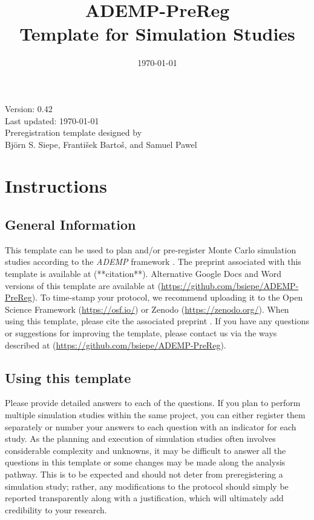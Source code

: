 \documentclass[12pt]{article}
\title{ADEMP-PreReg \\ Template for Simulation Studies}
\date{\today}
\begin{document}
\begin{titlepage}
    \maketitle
    \vfill
    \centering
    Version: 0.42 \\
    Last updated: \today \\
    Preregistration template designed by \\
    Björn S. Siepe, František Bartoš, and Samuel Pawel \\
    \vfill
\end{titlepage}

\newpage



\section{Instructions}
\subsection*{General Information}
This template can be used to plan and/or pre-register Monte Carlo simulation studies according to the \textit{ADEMP} framework \parencite{Morris2019}. The preprint associated with this template is available at (**citation**). Alternative Google Docs and Word versions of this template are available at (\url{https://github.com/bsiepe/ADEMP-PreReg}). To time-stamp your protocol, we recommend uploading it to the Open Science Framework (\url{https://osf.io/}) or Zenodo (\url{https://zenodo.org/}). When using this template, please cite the associated preprint \parencite{Siepe2023}. If you have any questions or suggestions for improving the template, please contact us via the ways described at (\url{https://github.com/bsiepe/ADEMP-PreReg}). \\

\subsection*{Using this template}
Please provide detailed answers to each of the questions. If you plan to perform multiple simulation studies within the same project, you can either register them separately or number your answers to each question with an indicator for each study. As the planning and execution of simulation studies often involves considerable complexity and unknowns, it may be difficult to answer all the questions in this template or some changes may be made along the analysis pathway. This is to be expected and should not deter from preregistering a simulation study; rather, any modifications to the protocol should simply be reported transparently along with a justification, which will ultimately add credibility to your research.
\end{document}
